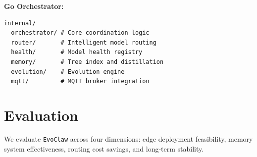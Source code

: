\documentclass[conference]{IEEEtran}
\newcommand{\evoclaw}{\texttt{EvoClaw}\xspace}
\begin{document}
\textbf{Go Orchestrator:}
\begin{lstlisting}[basicstyle=\ttfamily\footnotesize]
internal/
  orchestrator/ # Core coordination logic
  router/       # Intelligent model routing
  health/       # Model health registry
  memory/       # Tree index and distillation
  evolution/    # Evolution engine
  mqtt/         # MQTT broker integration
\end{lstlisting}



\section{Evaluation}
\label{sec:evaluation}

We evaluate \evoclaw{} across four dimensions: edge deployment feasibility, memory system effectiveness, routing cost savings, and long-term stability.
\end{document}
